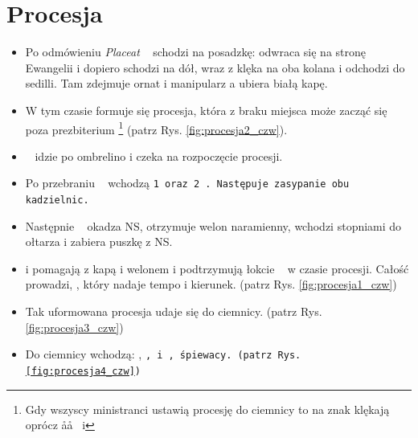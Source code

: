 \section{Procesja}

\begin{itemize}
      \item Po odmówieniu \textit{Placeat} \ii~ schodzi na posadzkę: odwraca się
            na stronę Ewangelii i dopiero schodzi na dół, wraz z  klęka na
            oba kolana i odchodzi do sedilli. Tam zdejmuje ornat i manipularz a
            ubiera białą kapę.
      \item W tym czasie formuje się procesja, która z braku miejsca może zacząć
            się poza prezbiterium \footnote{Gdy wszyscy ministranci ustawią
                  procesję do ciemnicy to na znak  klękają oprócz \aa\aa~ i
                  } (patrz Rys. \ref{fig:procesja2_czw}).
      \item \oo~ idzie po ombrelino i czeka na rozpoczęcie procesji.
      \item Po przebraniu \ii~ wchodzą \tt1 oraz \tt2 . Następuje zasypanie obu
            kadzielnic.
      \item Następnie \ii~ okadza NS, otrzymuje welon naramienny, wchodzi
            stopniami do ołtarza i zabiera puszkę z NS.
      \item {} i  pomagają z kapą i welonem i podtrzymują łokcie \ii~ w czasie
            procesji. Całość prowadzi, , który nadaje tempo i kierunek.
            (patrz Rys. \ref{fig:procesja1_czw})
      \item Tak uformowana procesja udaje się do ciemnicy. (patrz Rys.
            \ref{fig:procesja3_czw})
      \item Do ciemnicy wchodzą: \ii, \tt\tt,  i , śpiewacy. (patrz Rys.
            \ref{fig:procesja4_czw})
\end{itemize}

